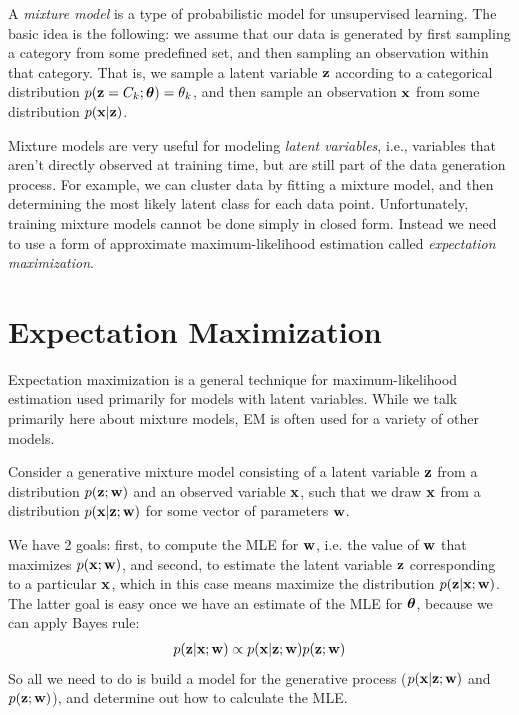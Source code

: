 \documentclass[12pt,letterpaper]{article}
\begin{document}
A \emph{mixture model} is a type of probabilistic
model for unsupervised learning. The basic idea is the following:
we assume that our data is generated by 
first sampling a category from some predefined
set, and then sampling an observation within
that category. That is, we sample a latent
variable $\mathbf{z}$ according to a categorical
distribution $p(\mathbf{z} = C_k; \boldsymbol{\theta}) = \theta_k$, and
then sample an observation $\mathbf{x}$ from
some distribution $p(\mathbf{x} | \mathbf{z})$.

\smallskip

Mixture models are very useful for modeling
\emph{latent variables}, i.e., variables that aren't 
directly observed at training time, but are
still part of the data generation process. For 
example, we can cluster data by fitting a mixture
model, and then determining the most likely
latent class for each data point. Unfortunately,
training mixture models cannot be done 
simply in closed form. Instead we need to use
a form of approximate maximum-likelihood estimation
called \emph{expectation maximization}.



\section{Expectation Maximization}
Expectation maximization is a general technique for maximum-likelihood estimation used primarily for models with latent variables. While we talk primarily here about mixture models, EM is often used for a variety of other models.

\smallskip 

Consider a generative mixture model consisting of a latent variable $\mathbf{z}$ from a distribution $p(\mathbf{z}; \mathbf{w})$ and an observed variable $\mathbf{x}$, such that we draw $\mathbf{x}$ from a distribution $p(\mathbf{x} | \mathbf{z}; \mathbf{w})$ for some vector of parameters $\mathbf{w}$. 

\smallskip

We have 2 goals: first, to compute the MLE for $\mathbf{w}$, i.e. the value of $\mathbf{w}$ that maximizes $p(\mathbf{x}; \mathbf{w})$, and second, to estimate the latent variable $\mathbf{z}$ corresponding to a particular $\mathbf{x}$, which in this case means maximize the distribution $p(\mathbf{z} | \mathbf{x}; \mathbf{w})$. The latter goal is easy once we have an estimate of the MLE for $\boldsymbol{\theta}$, because we can apply Bayes rule:
\begin{align}p(\mathbf{z} | \mathbf{x}; \mathbf{w}) \propto p(\mathbf{x} | \mathbf{z}; \mathbf{w})p(\mathbf{z}; \mathbf{w})\end{align}
So all we need to do is build a model for the generative process ($p(\mathbf{x} | \mathbf{z}; \mathbf{w})$ and $p(\mathbf{z}; \mathbf{w})$), and determine out how to calculate the MLE.
\end{document}
